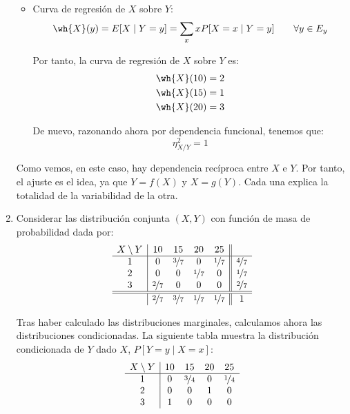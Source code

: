 \begin{ejercicio}
\begin{enumerate}
\begin{itemize}
            \item Curva de regresión de $X$ sobre $Y$:
            \begin{equation*}
                \wh{X}(y) = E[X\mid Y = y] = \sum_{x} x P[X = x\mid Y = y] \qquad \forall y\in E_y
            \end{equation*}

            Por tanto, la curva de regresión de $X$ sobre $Y$ es:
            \begin{align*}
                \wh{X}(10) &= 2\\
                \wh{X}(15) &= 1\\
                \wh{X}(20) &= 3
            \end{align*}

            De nuevo, razonando ahora por dependencia funcional, tenemos que:
            \begin{equation*}
                \eta^2_{X/Y} = 1
            \end{equation*}
        \end{itemize}

        Como vemos, en este caso, hay dependencia recíproca entre $X$ e $Y$. Por tanto,
        el ajuste es el idea, ya que $Y=f(X)$ y $X=g(Y)$.
        Cada una explica la totalidad de la variabilidad de la otra.


        \item Considerar las distribución conjunta $(X,Y)$ con función de masa de probabilidad dada por:
        \begin{equation*}
            \begin{array}{c|cccc||c}
                X\setminus Y & 10 & 15 & 20 & 25 &\\
                \hline
                1 & 0 & \nicefrac{3}{7} & 0 & \nicefrac{1}{7} & \nicefrac{4}{7}\\
                2 & 0 & 0 & \nicefrac{1}{7} & 0 & \nicefrac{1}{7}\\
                3 & \nicefrac{2}{7} & 0 & 0 & 0 & \nicefrac{2}{7}\\
                \hline \hline
                & \nicefrac{2}{7} & \nicefrac{3}{7} & \nicefrac{1}{7} & \nicefrac{1}{7} & 1
            \end{array}
        \end{equation*}

        Tras haber calculado las distribuciones marginales, calculamos ahora las distribuciones condicionadas.
        La siguiente tabla muestra la distribución condicionada de $Y$ dado $X$, $P[Y = y\mid X = x]$:
        \begin{equation*}
            \begin{array}{c|cccc}
                X\setminus Y & 10 & 15 & 20 & 25\\
                \hline
                1 & 0 & \nicefrac{3}{4} & 0 & \nicefrac{1}{4}\\
                2 & 0 & 0 & 1 & 0\\
                3 & 1 & 0 & 0 & 0
            \end{array}
        \end{equation*}


\end{enumerate}
\end{ejercicio}

